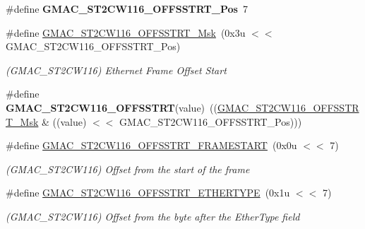 \begin{DoxyCompactItemize}
\item 
\mbox{\label{group__SAMV71__GMAC_gadace1572904d7981902fdfc18147015f}} 
\#define {\bfseries G\+M\+A\+C\+\_\+\+S\+T2\+C\+W116\+\_\+\+O\+F\+F\+S\+S\+T\+R\+T\+\_\+\+Pos}~7
\item 
\mbox{\label{group__SAMV71__GMAC_ga7e3cd1a1eca0a38d2e09c10584b5be36}} 
\#define \mbox{\hyperlink{group__SAMV71__GMAC_ga7e3cd1a1eca0a38d2e09c10584b5be36}{G\+M\+A\+C\+\_\+\+S\+T2\+C\+W116\+\_\+\+O\+F\+F\+S\+S\+T\+R\+T\+\_\+\+Msk}}~(0x3u $<$$<$ G\+M\+A\+C\+\_\+\+S\+T2\+C\+W116\+\_\+\+O\+F\+F\+S\+S\+T\+R\+T\+\_\+\+Pos)
\begin{DoxyCompactList}\small\item\em (G\+M\+A\+C\+\_\+\+S\+T2\+C\+W116) Ethernet Frame Offset Start \end{DoxyCompactList}\item 
\mbox{\label{group__SAMV71__GMAC_gaac9aabcc977dfcaf9f4c7b5da993879f}} 
\#define {\bfseries G\+M\+A\+C\+\_\+\+S\+T2\+C\+W116\+\_\+\+O\+F\+F\+S\+S\+T\+RT}(value)~((\mbox{\hyperlink{group__SAMV71__GMAC_ga7e3cd1a1eca0a38d2e09c10584b5be36}{G\+M\+A\+C\+\_\+\+S\+T2\+C\+W116\+\_\+\+O\+F\+F\+S\+S\+T\+R\+T\+\_\+\+Msk}} \& ((value) $<$$<$ G\+M\+A\+C\+\_\+\+S\+T2\+C\+W116\+\_\+\+O\+F\+F\+S\+S\+T\+R\+T\+\_\+\+Pos)))
\item 
\mbox{\label{group__SAMV71__GMAC_gabab3f0e132f3900e58dbf99b9d7d0b5a}} 
\#define \mbox{\hyperlink{group__SAMV71__GMAC_gabab3f0e132f3900e58dbf99b9d7d0b5a}{G\+M\+A\+C\+\_\+\+S\+T2\+C\+W116\+\_\+\+O\+F\+F\+S\+S\+T\+R\+T\+\_\+\+F\+R\+A\+M\+E\+S\+T\+A\+RT}}~(0x0u $<$$<$ 7)
\begin{DoxyCompactList}\small\item\em (G\+M\+A\+C\+\_\+\+S\+T2\+C\+W116) Offset from the start of the frame \end{DoxyCompactList}\item 
\mbox{\label{group__SAMV71__GMAC_ga07c3a8505787ab64e7fdfc072d67164d}} 
\#define \mbox{\hyperlink{group__SAMV71__GMAC_ga07c3a8505787ab64e7fdfc072d67164d}{G\+M\+A\+C\+\_\+\+S\+T2\+C\+W116\+\_\+\+O\+F\+F\+S\+S\+T\+R\+T\+\_\+\+E\+T\+H\+E\+R\+T\+Y\+PE}}~(0x1u $<$$<$ 7)
\begin{DoxyCompactList}\small\item\em (G\+M\+A\+C\+\_\+\+S\+T2\+C\+W116) Offset from the byte after the Ether\+Type field \end{DoxyCompactList}\item 

\end{DoxyCompactItemize}
